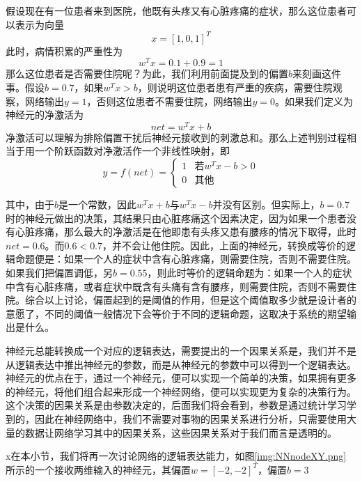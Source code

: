 假设现在有一位患者来到医院，他既有头疼又有心脏疼痛的症状，那么这位患者可以表示为向量
\begin{equation}
x = [1, 0, 1]^T
\end{equation}
此时，病情积累的严重性为
\begin{equation}
w^Tx = 0.1+0.9 = 1
\end{equation}
那么这位患者是否需要住院呢？为此，我们利用前面提及到的偏置$b$来刻画这件事。假设$b = 0.7$，如果$w^Tx>b$，则说明这位患者患有严重的疾病，需要住院观察，网络输出$y=1$，否则这位患者不需要住院，网络输出$y=0$。如果我们定义为神经元的净激活为
\begin{equation}
net = w^Tx + b
\end{equation}
净激活可以理解为排除偏置干扰后神经元接收到的刺激总和。那么上述判别过程相当于用一个阶跃函数对净激活作一个非线性映射，即
\begin{equation}
y = f(net) = \left\{
\begin{array}{cc}
1 & \text{若}w^Tx - b> 0 \\
0 & \text{其他}
\end{array}
\right.
\end{equation}

其中，由于$b$是一个常数，因此$w^Tx +b$与$w^Tx - b$并没有区别。但实际上，$b = 0.7$时的神经元做出的决策，其结果只由心脏疼痛这个因素决定，因为如果一个患者没有心脏疼痛，那么最大的净激活是在他即患有头疼又患有腰疼的情况下取得，此时$net=0.6$。而$0.6<0.7$，并不会让他住院。因此，上面的神经元，转换成等价的逻辑命题便是：如果一个人的症状中含有心脏疼痛，则需要住院，否则不需要住院。如果我们把偏置调低，另$b=0.55$，则此时等价的逻辑命题为：如果一个人的症状中含有心脏疼痛，或者症状中既含有头痛有含有腰疼，则需要住院，否则不需要住院。综合以上讨论，偏置起到的是阈值的作用，但是这个阈值取多少就是设计者的意愿了，不同的阈值一般情况下会等价于不同的逻辑命题，这取决于系统的期望输出是什么。

神经元总能转换成一个对应的逻辑表达，需要提出的一个因果关系是，我们并不是从逻辑表达中推出神经元的参数，而是从神经元的参数中可以得到一个逻辑表达。神经元的优点在于，通过一个神经元，便可以实现一个简单的决策，如果拥有更多的神经元，将他们组合起来形成一个神经网络，便可以实现更为复杂的决策行为。这个决策的因果关系是由参数决定的，后面我们将会看到，参数是通过统计学习学到的，因此在神经网络中，我们不需要对事物的因果关系进行分析，只需要使用大量的数据让网络学习其中的因果关系，这些因果关系对于我们而言是透明的。


x在本小节，我们将再一次讨论网络的逻辑表达能力，如图\ref{img:NNnodeXY.png} 所示的一个接收两维输入的神经元，其偏置$w = [-2, -2]^T$，偏置$b=3$

